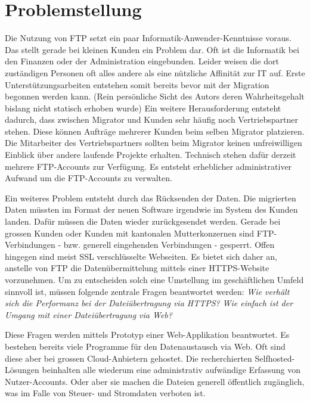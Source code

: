 \section{Problemstellung}
Die Nutzung von FTP setzt ein paar Informatik-Anwender-Kenntnisse voraus. Das stellt gerade bei kleinen Kunden ein Problem dar.
Oft ist die Informatik bei den Finanzen oder der Administration eingebunden. 
Leider weisen die dort zuständigen Personen oft alles andere als eine nützliche Affinität zur IT auf. 
Erste Unterstützungsarbeiten entstehen somit bereits bevor mit der Migration begonnen werden kann. 
(Rein persönliche Sicht des Autors deren Wahrheitsgehalt bislang nicht statisch erhoben wurde)
Ein weitere Herausforderung entsteht dadurch, dass zwischen Migrator und Kunden sehr häufig noch Vertriebspartner stehen. 
Diese können Aufträge mehrerer Kunden beim selben Migrator platzieren. 
Die Mitarbeiter des Vertriebspartners sollten beim Migrator keinen unfreiwilligen Einblick über andere laufende Projekte erhalten. 
Technisch stehen dafür derzeit mehrere FTP-Accounts zur Verfügung. Es entsteht erheblicher administrativer Aufwand um die FTP-Accounts zu verwalten.

Ein weiteres Problem entsteht durch das Rücksenden der Daten. 
Die migrierten Daten müssten im Format der neuen Software irgendwie im System des Kunden landen.
Dafür müssen die Daten wieder zurückgesendet werden. Gerade bei grossen Kunden oder Kunden mit kantonalen Mutterkonzernen sind FTP-Verbindungen - bzw. generell eingehenden Verbindungen - gesperrt. 
Offen hingegen sind meist SSL verschlüsselte Webseiten. 
Es bietet sich daher an, anstelle von FTP die Datenübermittelung mittels einer HTTPS-Website vorzunehmen. 
Um zu entscheiden solch eine Umstellung im geschäftlichen Umfeld sinnvoll ist, müssen folgende zentrale Fragen beantwortet werden:
\textit{Wie verhält sich die Performanz bei der Dateiübertragung via HTTPS?} 
\textit{Wie einfach ist der Umgang mit einer Dateiübertragung via Web?}


Diese Fragen werden mittels Prototyp einer Web-Applikation beantwortet. 
Es bestehen bereits viele Programme für den Datenaustausch via Web. Oft sind diese aber bei grossen Cloud-Anbietern gehostet. 
Die recherchierten Selfhosted-Lösungen beinhalten alle wiederum eine administrativ aufwändige Erfassung von Nutzer-Accounts.
Oder aber sie machen die Dateien generell öffentlich zugänglich, was im Falle von Steuer- und Stromdaten verboten ist.

